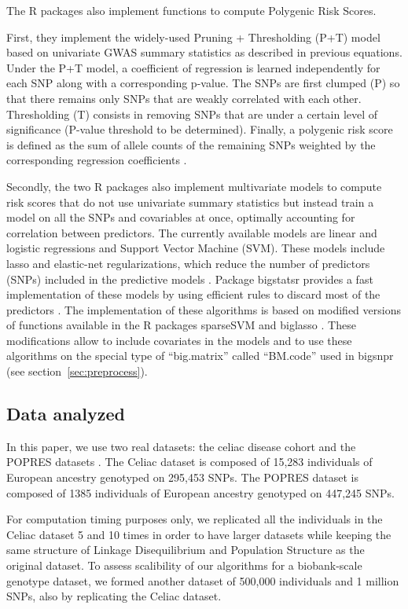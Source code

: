 \documentclass{bioinfo}
\begin{document}
The R packages also implement functions to compute Polygenic Risk Scores. 

First, they implement the widely-used Pruning + Thresholding (P+T) model based on univariate GWAS summary statistics as described in previous equations. Under the P+T model, a coefficient of regression is learned independently for each SNP along with a corresponding p-value. The SNPs are first clumped (P) so that there remains only SNPs that are weakly correlated with each other. Thresholding (T) consists in removing SNPs that are under a certain level of significance (P-value threshold to be determined). Finally, a polygenic risk score is defined as the sum of allele counts of the remaining SNPs weighted by the corresponding regression coefficients \cite[]{Dudbridge2013,Chatterjee2013,Golan2014}. 

Secondly, the two R packages also implement multivariate models to compute risk scores that do not use univariate summary statistics but instead train a model on all the SNPs and covariables at once, optimally accounting for correlation between predictors. The currently available models are linear and logistic regressions and Support Vector Machine (SVM). These models include lasso and elastic-net regularizations, which reduce the number of  predictors (SNPs) included in the predictive models \cite[]{Tibshirani1996,Zou2005,Friedman2010}. Package bigstatsr provides a fast implementation of these models by using efficient rules to discard most of the predictors \cite[]{Tibshirani2012}. The implementation of these algorithms is based on modified versions of functions available in the R packages sparseSVM and biglasso \cite[]{Zeng2017}. These modifications allow to include covariates in the models and to use these algorithms on the special type of ``big.matrix'' called ``BM.code'' used in bigsnpr (see section~\ref{sec:preprocess}).

\subsection{Data analyzed}

In this paper, we use two real datasets: the celiac disease cohort and the POPRES datasets \cite[]{Dubois2010,Nelson2008}. The Celiac dataset is composed of 15,283 individuals of European ancestry genotyped on 295,453 SNPs. The POPRES dataset is composed of 1385 individuals of European ancestry genotyped on 447,245 SNPs.

For computation timing purposes only, we replicated all the individuals in the Celiac dataset 5 and 10 times in order to have larger datasets while keeping the same structure of Linkage Disequilibrium and Population Structure as the original dataset. To assess scalibility of our algorithms for a biobank-scale genotype dataset, we formed another dataset of 500,000 individuals and 1 million SNPs, also by replicating the Celiac dataset. \label{sec:rep}
\end{document}
